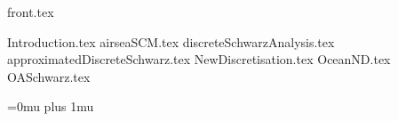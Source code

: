 



\newcommand{\currentlabel}{}
\let\oldlabel\label
\renewcommand{\label}[1]{\oldlabel{#1}\renewcommand{\currentlabel}{#1}}

\newcommand{\currentlabelchapter}{}
\newcommand{\labelchapter}[1]{\label{#1}\renewcommand{\currentlabelchapter}{#1}}


\newcommand{\mySub}[2]{{\noindent\bf#2}\tabto*{#1}}


\sloppy %

{front.tex}

\mainmatter
{Introduction.tex}
{airseaSCM.tex}
{discreteSchwarzAnalysis.tex}
{approximatedDiscreteSchwarz.tex}
{NewDiscretisation.tex}
{OceanND.tex}
{OASchwarz.tex}


\backmatter
\clearpage
{}
{}
\Urlmuskip=0mu plus 1mu\relax




